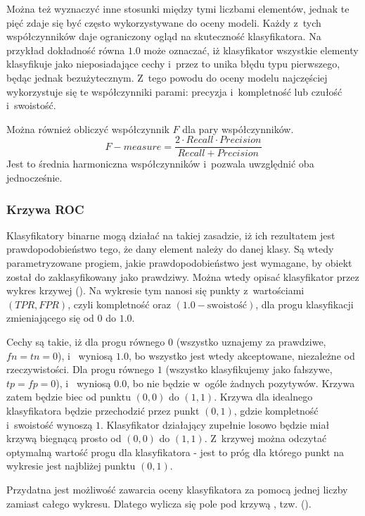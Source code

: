 Można też wyznaczyć inne stosunki między tymi liczbami elementów,
jednak te pięć zdaje się być często wykorzystywane do oceny modeli.
Każdy z~tych współczynników daje ograniczony ogląd na skuteczność
klasyfikatora. Na przykład dokładność równa $1.0$ może oznaczać,
iż klasyfikator wszystkie elementy klasyfikuje jako nieposiadające
cechy i~przez to unika błędu typu pierwszego, będąc jednak bezużytecznym.
Z~tego powodu do oceny modelu najczęściej wykorzystuje się te
współczynniki parami: precyzja i~kompletność lub czułość i~swoistość.

Można również obliczyć współczynnik $F$ dla pary współczynników.
$$\mathit{F{-}measure} = \frac{2 \cdot Recall \cdot Precision}{Recall + Precision}$$
Jest to średnia harmoniczna współczynników i~pozwala uwzględnić oba jednocześnie.

\subsubsection{Krzywa ROC}

Klasyfikatory binarne mogą działać na takiej zasadzie, iż ich rezultatem jest prawdopodobieństwo
tego, że dany element należy do danej klasy. Są wtedy parametryzowane progiem,
jakie prawdopodobieństwo jest wymagane, by obiekt został do zaklasyfikowany jako prawdziwy.
Można wtedy opisać klasyfikator przez wykres krzywej 
(). Na wykresie tym nanosi się punkty z~wartościami
$(\mathit{TPR}, \mathit{FPR})$, czyli kompletność oraz $(1.0 - \text{swoistość})$, dla progu klasyfikacji
zmieniającego się od $0$ do $1.0$.

Cechy  są takie, iż dla progu równego $0$ (wszystko uznajemy za prawdziwe, $fn = tn = 0$),
 i~
wyniosą $1.0$, bo wszystko jest wtedy akceptowane, niezależne od rzeczywistości.
Dla progu równego $1$ (wszystko klasyfikujemy jako fałszywe, $tp = fp = 0$),
 i~ wyniosą $0.0$, bo nie będzie w~ogóle żadnych pozytywów.
Krzywa zatem będzie biec od punktu $(0, 0)$ do $(1, 1)$. Krzywa dla idealnego klasyfikatora
będzie przechodzić przez punkt $(0, 1)$, gdzie kompletność i~swoistość wynoszą $1$. Klasyfikator
działający zupełnie losowo będzie miał krzywą biegnącą prosto od $(0, 0)$ do $(1, 1)$. Z~krzywej
 można odczytać optymalną wartość progu dla klasyfikatora - jest to próg dla którego punkt
na wykresie jest najbliżej punktu $(0, 1)$.

Przydatna jest możliwość zawarcia oceny klasyfikatora za pomocą jednej liczby zamiast całego wykresu.
Dlatego wylicza się pole pod krzywą , tzw.  ().

